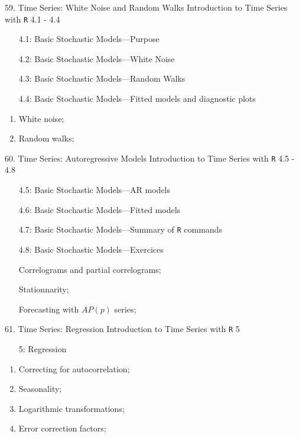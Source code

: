 \documentclass[12pt, titlepage, french]{report}
\begin{document}
\begin{CHPT_SUMM_AUTO}[label = {L.-59}]{59. Time Series: White Noise and Random Walks}
Introduction to Time Series with \texttt{R} 4.1 - 4.4
\begin{itemize}
	\item[4.1:]	Basic Stochastic Models---Purpose
	\item[4.2:]	Basic Stochastic Models---White Noise
	\item[4.3:]	Basic Stochastic Models---Random Walks
	\item[4.4:]	Basic Stochastic Models---Fitted models and diagnostic plots
\end{itemize}
\tcbline
	\begin{enumerate}
		\item	White noise;
		\item	Random walks;
	\end{enumerate}
\end{CHPT_SUMM_AUTO}

\begin{CHPT_SUMM_AUTO}[label = {L.-60}]{60. Time Series: Autoregressive Models}
Introduction to Time Series with \texttt{R} 4.5 - 4.8
\begin{itemize}
	\item[4.5:]	Basic Stochastic Models---AR models
	\item[4.6:]	Basic Stochastic Models---Fitted models
	\item[4.7:]	Basic Stochastic Models---Summary of \texttt{R} commands
	\item[4.8:]	Basic Stochastic Models---Exercices
\end{itemize}
\tcbline
	\begin{enumerate}
		\item[]	Correlograms and partial correlograms;
		\item[]	Stationnarity;
		\item[]	Forecasting with $AP(p)$ series;
	\end{enumerate}
\end{CHPT_SUMM_AUTO}

\begin{CHPT_SUMM_AUTO}[label = {L.-61}]{61. Time Series: Regression}
Introduction to Time Series with \texttt{R} 5
\begin{itemize}
	\item[5:]	Regression
\end{itemize}
\tcbline
	\begin{enumerate}
		\item	Correcting for autocorrelation;
		\item	Seasonality;
		\item	Logarithmic transformations;
		\item	Error correction factors;
	\end{enumerate}
\end{CHPT_SUMM_AUTO}
\end{document}
